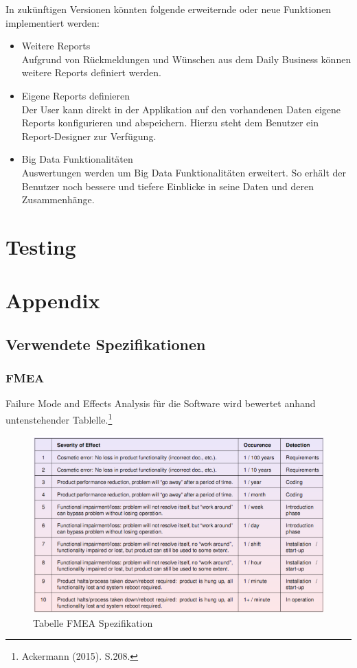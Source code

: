 \documentclass[a4paper]{scrreprt}
\begin{document}
In zukünftigen Versionen könnten folgende erweiternde oder neue Funktionen implementiert werden:
\begin{itemize}
\item Weitere Reports\\
Aufgrund von Rückmeldungen und Wünschen aus dem Daily Business können weitere Reports definiert werden.
\item Eigene Reports definieren\\
Der User kann direkt in der Applikation auf den vorhandenen Daten eigene Reports konfigurieren und abspeichern. Hierzu steht dem Benutzer ein Report-Designer zur Verfügung.
\item Big Data Funktionalitäten \\
Auswertungen werden um Big Data Funktionalitäten erweitert. So erhält der Benutzer noch bessere und tiefere Einblicke in seine Daten und deren Zusammenhänge.
\end{itemize}


\chapter{Testing}



\chapter{Appendix}

\section{Verwendete Spezifikationen}
\subsection{FMEA}
Failure Mode and Effects Analysis für die Software wird bewertet anhand untenstehender Tablelle.\footnote{Ackermann (2015). S.208.}


\begin{figure}[htbp]
\includegraphics[width=1\textwidth]{img/fmea.png}
\caption[Tabelle FMEA Spezifikation]{Tabelle FMEA Spezifikation}
\end{figure}
\end{document}
